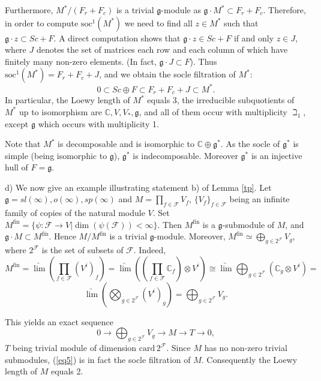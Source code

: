 \documentclass{birkmult}
\newcommand {\CC} {\mathbb {C}}
\newcommand {\card} {\mathrm {card}}
\renewcommand{\gg}{\mathfrak{g}}
\newcommand{\refeq}[1]{(\ref{#1})}
\newcommand{\fin}{\mathrm{fin}}
\newcommand{\ds}{\displaystyle}
\newcommand{\soc}{\mathrm{soc}}
\begin{document}
Furthermore, $M^*/(F_r+F_c)$ is a trivial $\gg$-module as
$\gg\cdot M^*\subset F_r+F_c$. Therefore, in order to compute $\soc^1(M^*)$ we
need to find all $z\in M^*$ such that $\gg\cdot z\subset Sc+F$. A
direct computation shows that $\gg\cdot z\in Sc+F$ if and only $z\in
J$, where $J$ denotes the set of matrices each row and each column of
which have finitely many non-zero elements. (In fact, $\gg\cdot J \subset F$). Thus 
$\soc^1(M^*)=F_r+F_c+J$, and we obtain
the socle filtration of $M^*$:
$$0\subset Sc\oplus F\subset F_r+F_c+J\subset M^*.$$
In particular, the Loewy length of $M^*$ equals 3, the irreducible
subquotients of $M^*$ up to isomorphism are $\mathbb C,V,V_*,\gg$,
and all of them occur with multiplicity $\beth_1$, except $\gg$
which occurs with multiplicity 1.

Note that $M^*$ is decomposable and is isomorphic to
$\CC\oplus \gg^*$. As the socle
of $\gg^*$ is simple (being isomorphic to $\gg$), $\gg^*$ is
indecomposable. Moreover $\gg^*$ is an injective hull of $F=\gg$.

d) We now give an example illustrating statement b) of Lemma
\ref{tp}. Let $\gg=sl(\infty), o(\infty), sp(\infty)$ and $\ds
M=\prod_{f\in\mathcal F}V_f$, $\{V_f\}_{f\in\mathcal F}$ being an infinite
family of copies of the natural module $V$. Set
$M^{\fin}=\{\psi:\mathcal F\to V | \dim(\psi(\mathcal
F))<\infty\}$. Then $M^{\fin}$ is a $\gg$-submodule of $M$, and
$\gg\cdot M\subset M^{\fin}$. Hence $M/M^{\fin}$ is a trivial
$\gg$-module. Moreover, $\ds
M^{\fin}\simeq \bigoplus_{g\in 2^{\mathcal F}}V_g$, where
$2^{\mathcal F}$ is the set of subsets of $\mathcal F$. Indeed,
$$M^{\fin}=\underrightarrow{\lim}(\prod_{f\in\mathcal F}(V^i)_f)=\underrightarrow{\lim}
((\prod_{f\in\mathcal F}\mathbb{C}_f)\otimes V^i)\cong
\underrightarrow{\lim}\bigoplus_{g\in 2^{\mathcal F}}(\mathbb{C}_g\otimes V^i)=$$ $$
\underrightarrow{\lim}(\bigotimes_{g\in 2^{\mathcal F}}(V^i)_g)=
\bigoplus_{g\in 2^{\mathcal F}}V_g.$$ 

This yields an exact sequence
\begin{equation}\label{eq5}
0\to \bigoplus_{g\in 2^{\mathcal F}}V_{g} \to M\to T\to 0,
\end{equation}
$T$ being trivial module of dimension $\card\,2^{\mathcal F}$.
Since $M$ has no non-zero trivial submodules, \refeq{eq5} is in
fact the socle filtration of $M$. Consequently the Loewy length of
$M$ equals 2.
\end{document}
